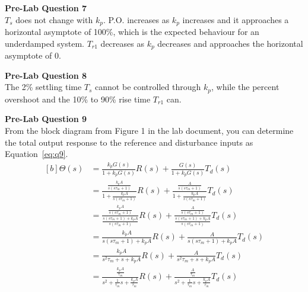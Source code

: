 \documentclass[12pt]{article}
\begin{document}
\textbf{Pre-Lab Question 7} \\
$T_s$ does not change with $k_p$. P.O. increases as $k_p$ increases and it approaches a horizontal asymptote of 100\%, which is the expected behaviour for an underdamped system. $T_{r1}$ decreases as $k_p$ decreases and approaches the horizontal asymptote of 0.

\textbf{Pre-Lab Question 8} \\
The 2\% settling time $T_s$ cannot be controlled through $k_p$, while the percent overshoot and the 10\% to 90\% rise time $T_{r1}$ can.

\textbf{Pre-Lab Question 9} \\
From the block diagram from Figure 1 in the lab document, you can determine the total output response to the reference and disturbance inputs as Equation~\ref{eq:q9}.
\begin{equation} \label{eq:q9}
\begin{aligned}[b]
    \Theta(s) &= \frac{k_pG(s)}{1 + k_pG(s)}R(s) + \frac{G(s)}{1 + k_pG(s)}T_d(s) \\
    &= \frac{\frac{k_pA}{s(s\tau_m + 1)}}{1 + \frac{k_pA}{s(s\tau_m + 1)}}R(s) + \frac{\frac{A}{s(s\tau_m + 1)}}{1 + \frac{k_pA}{s(s\tau_m + 1)}}T_d(s) \\
    &= \frac{\frac{k_pA}{s(s\tau_m + 1)}}{\frac{s(s\tau_m + 1) + k_pA}{s(s\tau_m + 1)}}R(s) + \frac{\frac{A}{s(s\tau_m + 1)}}{\frac{s(s\tau_m + 1) + k_pA}{s(s\tau_m + 1)}}T_d(s) \\
    &= \frac{k_pA}{s(s\tau_m + 1) + k_pA}R(s) + \frac{A}{s(s\tau_m + 1) + k_pA}T_d(s) \\
    &= \frac{k_pA}{s^2\tau_m + s + k_pA}R(s) + \frac{A}{s^2\tau_m + s + k_pA}T_d(s) \\
    &= \frac{\frac{k_pA}{\tau_m}}{s^2 + \frac{1}{\tau_m}s + \frac{k_pA}{\tau_m}}R(s) + \frac{\frac{A}{\tau_m}}{s^2 + \frac{1}{\tau_m}s + \frac{k_pA}{\tau_m}}T_d(s)
\end{aligned}
\end{equation}
\end{document}
